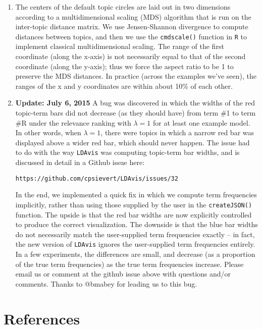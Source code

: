 \documentclass[12pt]{article}
\begin{document}
\begin{enumerate}
\item The centers of the default topic circles are laid out in two dimensions according to a multidimensional scaling (MDS) algorithm that is run on the inter-topic distance matrix. We use Jensen-Shannon divergence to compute distances between topics, and then we use the \texttt{cmdscale()} function in \texttt{R} to implement classical multidimensional scaling. The range of the first coordinate (along the x-axis) is not necessarily equal to that of the second coordinate (along the y-axis); thus we force the aspect ratio to be 1 to preserve the MDS distances. In practice (across the examples we've seen), the ranges of the x and y coordinates are within about 10\% of each other.

\item \textbf{Update: July 6, 2015} A bug was discovered in which the widths of the red topic-term bars did not decrease (as they should have) from term \#1 to term \#R under the relevance ranking with $\lambda = 1$ for at least one example model. In other words, when $\lambda = 1$, there were topics in which a narrow red bar was displayed above a wider red bar, which should never happen. The issue had to do with the way \texttt{LDAvis} was computing topic-term bar widths, and is discussed in detail in a Github issue here:

\texttt{https://github.com/cpsievert/LDAvis/issues/32}

In the end, we implemented a quick fix in which we compute term frequencies implicitly, rather than using those supplied by the user in the \texttt{createJSON()} function. The upside is that the red bar widths are now explicitly controlled to produce the correct visualization. The downside is that the blue bar widths do not necessarily match the user-supplied term frequencies exactly -- in fact, the new version of \texttt{LDAvis} ignores the user-supplied term frequencies entirely. In a few experiments, the differences are small, and decrease (as a proportion of the true term frequencies) as the true term frequencies increase. Please email us or comment at the github issue above with questions and/or comments. Thanks to @bmabey for leading us to this bug.
\end{enumerate}





\section{References}
\end{document}
